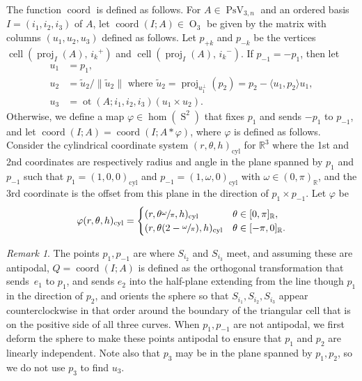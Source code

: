 \documentclass[11pt]{article}
\numberwithin{equation}{section}
\theoremstyle{remark}
\newtheorem{remark}[theorem]{Remark}
\let\mb\mathbb
\let\phi\varphi
\DeclareMathOperator{\orth}{O}
\DeclareMathOperator{\pstief}{PsV}
\DeclareMathOperator{\sphere}{S}
\DeclareMathOperator{\cell}{cell}
\DeclareMathOperator{\proj}{proj}
\DeclareMathOperator{\coord}{coord}
\DeclareMathOperator{\ot}{ot}
\begin{document}
The function $\coord$ is defined as follows.
For $A\in \pstief_{3,n}$ and an ordered basis $I = (i_1,i_2,i_3)$ of $A$,
let $\coord(I;A)\in \orth_3$ be given by the matrix with columns $(u_1,u_2,u_3)$ defined as follows.
Let $p_{+k}$ and $p_{-k}$ be the vertices $\cell(\proj_I(A),\, {i_k}^+)$ and $\cell(\proj_I(A),\, {i_k}^-)$.
If $p_{- 1} = -p_{1}$, then let
\begin{align*}
u_1 &= p_1, \\
u_2 &= \tilde u_2/ \|\tilde u_2\| \text{ where } \tilde u_2 = \proj_{u_1^{\perp}}(p_2) = {p_2 -\langle u_1, p_2 \rangle u_1}, \\
u_3 &= \ot(A;i_1,i_2,i_3) ( u_1 \times u_2).
\end{align*}
Otherwise, we define a map $\varphi \in \hom(\sphere^2)$ that fixes $p_1$ and sends $-p_{1}$ to $p_{-1}$, and let $\coord(I;A) = \coord(I;A * \varphi)$, where $\phi$ is defined as follows.
Consider the cylindrical coordinate system $(r,\theta,h)_\mathrm{cyl}$ for $\mb{R}^3$ where the 1st and 2nd coordinates are respectively radius and angle in the plane spanned by $p_1$ and $p_{-1}$ such that $p_1 =(1,0,0)_\mathrm{cyl}$ and $p_{-1} = (1,\omega,0)_\mathrm{cyl}$ with $\omega \in (0,\pi)_\mb{R}$, and the 3rd coordinate is the offset from this plane in the direction of $p_1 \times p_{-1}$. Let $\varphi$ be
\[ \varphi(r,\theta,h)_\mathrm{cyl} = \begin{cases} (r,\theta \sfrac{\omega}{\pi},h)_\mathrm{cyl} & \theta \in [0,\pi]_\mb{R}, \\ (r,\theta (2-\sfrac{\omega}{\pi}),h)_\mathrm{cyl} & \theta \in [-\pi,0]_\mb{R}. \end{cases} \]

\begin{remark}
The points $p_{1},p_{-1}$ are where $S_{i_2}$ and $S_{i_3}$ meet, and assuming these are antipodal, $Q = \coord(I;A)$ is defined as the orthogonal transformation that sends~$e_{1}$ to $p_1$, and sends $e_2$ into the half-plane extending from the line though $p_1$ in the direction of $p_2$, and orients the sphere so that $S_{i_1},S_{i_2},S_{i_3}$ appear counterclockwise in that order around the boundary of the triangular cell that is on the positive side of all three curves.
When $p_{1},p_{-1}$ are not antipodal, we first deform the sphere to make these points antipodal to ensure that $p_1$ and $p_2$ are linearly independent.
Note also that $p_3$ may be in the plane spanned by $p_1,p_2$, so we do not use $p_3$ to find $u_3$.
\end{remark}
\end{document}
